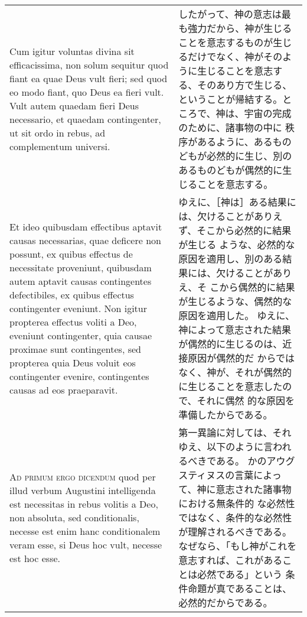\documentclass[10pt]{jsarticle} %
\begin{document}
\begin{longtable}{p{21em}p{21em}}
\\



Cum igitur voluntas divina sit
efficacissima, non solum sequitur quod fiant ea quae Deus vult fieri;
sed quod eo modo fiant, quo Deus ea fieri vult. Vult autem quaedam fieri
Deus necessario, et quaedam contingenter, ut sit ordo in rebus, ad
complementum universi. 

&

したがって、神の意志は最も強力だから、神が生じることを意志するものが生じ
 るだけでなく、神がそのように生じることを意志する、そのあり方で生じる、
 ということが帰結する。ところで、神は、宇宙の完成のために、諸事物の中に
 秩序があるように、あるものどもが必然的に生じ、別の
 あるものどもが偶然的に生じることを意志する。

\\



Et ideo quibusdam effectibus aptavit causas
necessarias, quae deficere non possunt, ex quibus effectus de
necessitate proveniunt, quibusdam autem aptavit causas contingentes
defectibiles, ex quibus effectus contingenter eveniunt. Non igitur
propterea effectus voliti a Deo, eveniunt contingenter, quia causae
proximae sunt contingentes, sed propterea quia Deus voluit eos
contingenter evenire, contingentes causas ad eos praeparavit.


&


ゆえに、［神は］ある結果には、欠けることがありえず、そこから必然的に結果が生じる
 ような、必然的な原因を適用し、別のある結果には、欠けることがありえ、そ
 こから偶然的に結果が生じるような、偶然的な原因を適用した。
ゆえに、神によって意志された結果が偶然的に生じるのは、近接原因が偶然的だ
 からではなく、神が、それが偶然的に生じることを意志したので、それに偶然
 的な原因を準備したからである。

\\


{\scshape Ad primum ergo dicendum} quod per illud verbum
Augustini intelligenda est necessitas in rebus volitis a Deo, non
absoluta, sed conditionalis, necesse est enim hanc conditionalem veram
esse, si Deus hoc vult, necesse est hoc esse.


&

第一異論に対しては、それゆえ、以下のように言われるべきである。
かのアウグスティヌスの言葉によって、神に意志された諸事物における無条件的
 な必然性ではなく、条件的な必然性が理解されるべきである。
なぜなら、「もし神がこれを意志すれば、これがあることは必然である」という
 条件命題が真であることは、必然的だからである。


\end{longtable}
\end{document}
